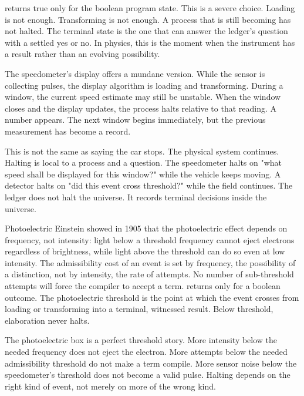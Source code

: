  returns true only for the boolean program state. This is a severe
choice. Loading is not enough. Transforming is not enough. A process that is
still becoming has not halted. The terminal state is the one that can answer
the ledger's question with a settled yes or no. In physics, this is the moment
when the instrument has a result rather than an evolving possibility.

The speedometer's display offers a mundane version. While the sensor is
collecting pulses, the display algorithm is loading and transforming. During a
window, the current speed estimate may still be unstable. When the window
closes and the display updates, the process halts relative to that reading. A
number appears. The next window begins immediately, but the previous
measurement has become a record.

This is not the same as saying the car stops. The physical system continues.
Halting is local to a process and a question. The speedometer halts on "what
speed shall be displayed for this window?" while the vehicle keeps moving. A
detector halts on "did this event cross threshold?" while the field continues.
The ledger does not halt the universe. It records terminal decisions inside the
universe.

\begin{gphenom}{Photoelectric}
\label{ph:photoelectric}
\GPhObs Einstein showed in 1905 that the photoelectric effect depends on
frequency, not intensity: light below a threshold frequency cannot eject
electrons regardless of brightness, while light above the threshold can do so
even at low intensity.
\GPhCon The admissibility cost of an event is set by frequency, the possibility
of a distinction, not by intensity, the rate of attempts. No number of
sub-threshold attempts will force the compiler to accept a term.
\GPhSeq {} returns  only for a boolean outcome. The
photoelectric threshold is the point at which the event crosses from loading or
transforming into a terminal, witnessed result. Below threshold, elaboration
never halts.
\end{gphenom}

The photoelectric box is a perfect threshold story. More intensity below the
needed frequency does not eject the electron. More attempts below the needed
admissibility threshold do not make a term compile. More sensor noise below
the speedometer's threshold does not become a valid pulse. Halting depends on
the right kind of event, not merely on more of the wrong kind.

